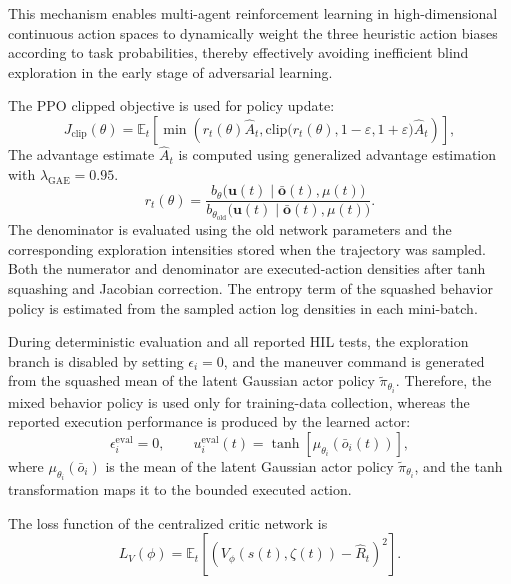 \documentclass{cja}
\begin{document}
This mechanism enables multi-agent reinforcement learning in high-dimensional continuous action spaces to dynamically weight the three heuristic action biases according to task probabilities, thereby effectively avoiding inefficient blind exploration in the early stage of adversarial learning.

The PPO clipped objective is used for policy update:
\begin{equation}
J_{\mathrm{clip}}(\theta)
=
\mathbb E_t
\left[
\min
\left(
r_t(\theta)\hat A_t,
\mathrm{clip}\bigl(r_t(\theta),1-\varepsilon,1+\varepsilon\bigr)\hat A_t
\right)
\right],
\end{equation}
The advantage estimate $\hat A_t$ is computed using generalized advantage estimation with $\lambda_{\mathrm{GAE}}=0.95$.
\begin{equation}
r_t(\theta)
=
\frac{
b_{\theta}\bigl(\mathbf u(t)\mid \bar{\mathbf o}(t),\mu(t)\bigr)
}{
b_{\theta_{\mathrm{old}}}\bigl(\mathbf u(t)\mid \bar{\mathbf o}(t),\mu(t)\bigr)
}.
\end{equation}
The denominator is evaluated using the old network parameters and the corresponding exploration intensities stored when the trajectory was sampled. Both the numerator and denominator are executed-action densities after tanh squashing and Jacobian correction.
The entropy term of the squashed behavior policy is estimated from the sampled action log densities in each mini-batch.

During deterministic evaluation and all reported HIL tests, the exploration branch is disabled by setting $\epsilon_i=0$, and the maneuver command is generated from the squashed mean of the latent Gaussian actor policy $\widetilde\pi_{\theta_i}$. Therefore, the mixed behavior policy is used only for training-data collection, whereas the reported execution performance is produced by the learned actor:
\begin{equation}
\epsilon_i^{\mathrm{eval}}=0,
\qquad
u_i^{\mathrm{eval}}(t)
=
\tanh
\left[
\mu_{\theta_i}
\left(
\bar o_i(t)
\right)
\right],
\end{equation}
where $\mu_{\theta_i}(\bar o_i)$ is the mean of the latent Gaussian actor policy $\widetilde\pi_{\theta_i}$, and the tanh transformation maps it to the bounded executed action.

The loss function of the centralized critic network is
\begin{equation}
L_V(\phi)
=
\mathbb E_t
\left[
\left(
V_{\phi}(s(t),\zeta(t))
-
\hat R_t
\right)^2
\right].
\end{equation}
\end{document}
